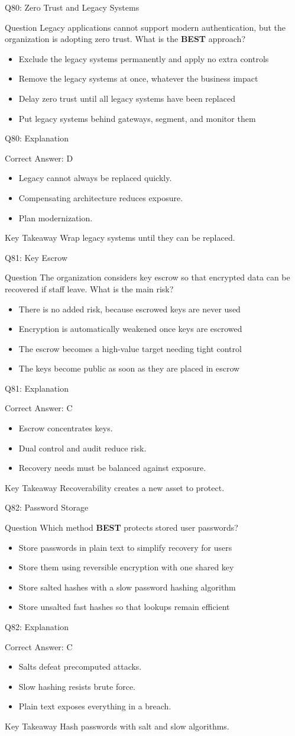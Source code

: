 \documentclass[aspectratio=169]{beamer}
\newcommand{\hq}[7]{%
	\begin{frame}{Q#1: #2}
		\begin{block}{Question}
			#3
		\end{block}
		\begin{itemize}
			#4
		\end{itemize}
	\end{frame}
	\begin{frame}{Q#1: Explanation}
		\begin{block}{Correct Answer: #5}
			\begin{itemize}
				#6
			\end{itemize}
		\end{block}
		\begin{alertblock}{Key Takeaway}
			#7
		\end{alertblock}
	\end{frame}
}
\begin{document}
	\hq{80}{Zero Trust and Legacy Systems}
	{Legacy applications cannot support modern authentication, but the organization is adopting zero trust. What is the \textbf{BEST} approach?}
	{\item[\textbf{(A)}] Exclude the legacy systems permanently and apply no extra controls
		\item[\textbf{(B)}] Remove the legacy systems at once, whatever the business impact
		\item[\textbf{(C)}] Delay zero trust until all legacy systems have been replaced
		\item[\textbf{(D)}] Put legacy systems behind gateways, segment, and monitor them}
	{D}
	{\item Legacy cannot always be replaced quickly.
		\item Compensating architecture reduces exposure.
		\item Plan modernization.}
	{Wrap legacy systems until they can be replaced.}

	\hq{81}{Key Escrow}
	{The organization considers key escrow so that encrypted data can be recovered if staff leave. What is the main risk?}
	{\item[\textbf{(A)}] There is no added risk, because escrowed keys are never used
		\item[\textbf{(B)}] Encryption is automatically weakened once keys are escrowed
		\item[\textbf{(C)}] The escrow becomes a high-value target needing tight control
		\item[\textbf{(D)}] The keys become public as soon as they are placed in escrow}
	{C}
	{\item Escrow concentrates keys.
		\item Dual control and audit reduce risk.
		\item Recovery needs must be balanced against exposure.}
	{Recoverability creates a new asset to protect.}

	\hq{82}{Password Storage}
	{Which method \textbf{BEST} protects stored user passwords?}
	{\item[\textbf{(A)}] Store passwords in plain text to simplify recovery for users
		\item[\textbf{(B)}] Store them using reversible encryption with one shared key
		\item[\textbf{(C)}] Store salted hashes with a slow password hashing algorithm
		\item[\textbf{(D)}] Store unsalted fast hashes so that lookups remain efficient}
	{C}
	{\item Salts defeat precomputed attacks.
		\item Slow hashing resists brute force.
		\item Plain text exposes everything in a breach.}
	{Hash passwords with salt and slow algorithms.}
\end{document}
